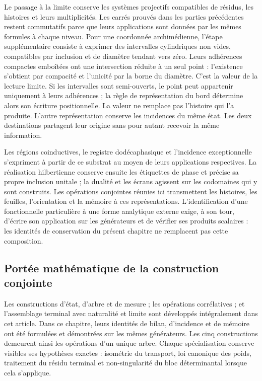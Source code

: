 Le passage à la limite conserve les systèmes projectifs compatibles de résidus, les histoires et leurs multiplicités. Les carrés prouvés dans les parties précédentes restent commutatifs parce que leurs applications sont données par les mêmes formules à chaque niveau. Pour une coordonnée archimédienne, l’étape supplémentaire consiste à exprimer des intervalles cylindriques non vides, compatibles par inclusion et de diamètre tendant vers zéro. Leurs adhérences compactes emboîtées ont une intersection réduite à un seul point : l’existence s’obtient par compacité et l’unicité par la borne du diamètre. C’est la valeur de la lecture limite. Si les intervalles sont semi-ouverts, le point peut appartenir uniquement à leurs adhérences ; la règle de représentation du bord détermine alors son écriture positionnelle. La valeur ne remplace pas l’histoire qui l’a produite. L’autre représentation conserve les incidences du même état. Les deux destinations partagent leur origine sans pour autant recevoir la même information.

Les régions coinductives, le registre dodécaphasique et l’incidence exceptionnelle s’expriment à partir de ce substrat au moyen de leurs applications respectives. La réalisation hilbertienne conserve ensuite les étiquettes de phase et précise sa propre inclusion unitale ; la dualité et les écrans agissent sur les codomaines qui y sont construits. Les opérations conjointes réunies ici transmettent les histoires, les feuilles, l’orientation et la mémoire à ces représentations. L’identification d’une fonctionnelle particulière à une forme analytique externe exige, à son tour, d’écrire son application sur les générateurs et de vérifier ses produits scalaires : les identités de conservation du présent chapitre ne remplacent pas cette composition.

\subsection{Portée mathématique de la construction conjointe}
Les constructions d'état, d'arbre et de mesure ; les opérations corrélatives ; et
l'assemblage terminal avec naturalité et limite sont développés intégralement
dans cet article. Dans ce chapitre, leurs identités de
bilan, d'incidence et de mémoire ont été formulées et démontrées sur les mêmes
générateurs. Les cinq constructions demeurent ainsi les opérations d'un
unique arbre. Chaque spécialisation conserve visibles ses hypothèses exactes :
isométrie du transport, loi canonique des poids, traitement du résidu
terminal et non-singularité du bloc déterminantal lorsque cela s'applique.

